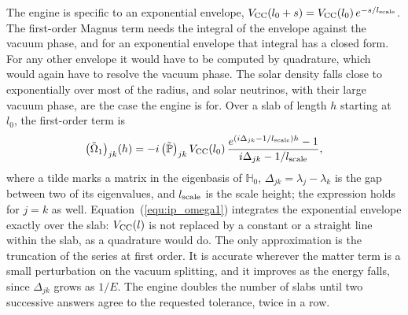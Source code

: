 \documentclass[final,5p,times,twocolumn,sort,compress]{elsarticle}
\makeatletter
\DeclareRobustCommand{\_}{%
  \ifmmode\nfss@text{\textunderscore}\else\textunderscore\allowbreak\fi}
\makeatother
\begin{document}
\begin{enumerate}
The engine is specific to an exponential envelope, $V_{\rm CC}(l_0 + s) = V_{\rm CC}(l_0)\,e^{-s/l_{\rm scale}}$. The first-order Magnus term needs the integral of the envelope against the vacuum phase, and for an exponential envelope that integral has a closed form. For any other envelope it would have to be computed by quadrature, which would again have to resolve the vacuum phase. The solar density falls close to exponentially over most of the radius, and solar neutrinos, with their large vacuum phase, are the case the engine is for. Over a slab of length $h$ starting at $l_0$, the first-order term is
\begin{equation}
 \label{equ:ip_omega1}
 \big(\tilde{\Omega}_1\big)_{jk}(h)
 = -i\, \big(\tilde{\mathbb{P}}\big)_{jk}\, V_{\rm CC}(l_0)\,
 \frac{e^{(i \Delta_{jk} - 1/l_{\rm scale})h} - 1}{i \Delta_{jk} - 1/l_{\rm scale}} ,
\end{equation}
where a tilde marks a matrix in the eigenbasis of $\mathbb{H}_0$, $\Delta_{jk} = \lambda_j - \lambda_k$ is the gap between two of its eigenvalues, and $l_{\rm scale}$ is the scale height; the expression holds for $j = k$ as well. Equation~(\ref{equ:ip_omega1}) integrates the exponential envelope exactly over the slab: $V_{\rm CC}(l)$ is not replaced by a constant or a straight line within the slab, as a quadrature would do. The only approximation is the truncation of the series at first order. It is accurate wherever the matter term is a small perturbation on the vacuum splitting, and it improves as the energy falls, since $\Delta_{jk}$ grows as $1/E$. The engine doubles the number of slabs until two successive answers agree to the requested tolerance, twice in a row.


\end{enumerate}
\end{document}
